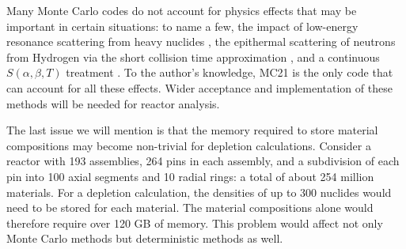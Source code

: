 Many Monte Carlo codes do not account for physics effects that may be important
in certain situations: to name a few, the impact of low-energy resonance
scattering from heavy nuclides \cite{ane-becker-2009, physor-sunny-2012}, the
epithermal scattering of neutrons from Hydrogen via the short collision time
approximation \cite{mc-sutton-2009}, and a continuous $S(\alpha,\beta,T)$
treatment \cite{physor-pavlou-2012}. To the author's knowledge, MC21 is the only
code that can account for all these effects. Wider acceptance and implementation
of these methods will be needed for reactor analysis.

The last issue we will mention is that the memory required to store material
compositions may become non-trivial for depletion calculations. Consider a
reactor with 193 assemblies, 264 pins in each assembly, and a subdivision of
each pin into 100 axial segments and 10 radial rings: a total of about 254
million materials. For a depletion calculation, the densities of up to 300
nuclides would need to be stored for each material. The material compositions
alone would therefore require over 120 GB of memory. This problem would affect
not only Monte Carlo methods but deterministic methods as well.
